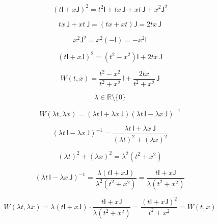 \documentclass[12pt]{article}
\begin{document}
\begin{equation}
(t\mathsf{I}+x\mathsf{J})^2=t^2\mathsf{I}+tx\,\mathsf{J}+xt\,\mathsf{J}+x^2\mathsf{J}^2
\end{equation}

\begin{equation}
tx\,\mathsf{J}+xt\,\mathsf{J}=(tx+xt)\mathsf{J}=2tx\,\mathsf{J}
\end{equation}

\begin{equation}
x^2\mathsf{J}^2=x^2(-\mathsf{I})=-x^2\mathsf{I}
\end{equation}

\begin{equation}
(t\mathsf{I}+x\mathsf{J})^2=(t^2-x^2)\mathsf{I}+2tx\,\mathsf{J}
\end{equation}

\begin{equation}
W(t,x)=\frac{t^2-x^2}{t^2+x^2}\,\mathsf{I}+\frac{2tx}{t^2+x^2}\,\mathsf{J}
\end{equation}

\begin{equation}
\lambda\in\mathbb{R}\setminus\{0\}
\end{equation}

\begin{equation}
W(\lambda t,\lambda x)=(\lambda t\,\mathsf{I}+\lambda x\,\mathsf{J})(\lambda t\,\mathsf{I}-\lambda x\,\mathsf{J})^{-1}
\end{equation}

\begin{equation}
(\lambda t\,\mathsf{I}-\lambda x\,\mathsf{J})^{-1}=\frac{\lambda t\,\mathsf{I}+\lambda x\,\mathsf{J}}{(\lambda t)^2+(\lambda x)^2}
\end{equation}

\begin{equation}
(\lambda t)^2+(\lambda x)^2=\lambda^2(t^2+x^2)
\end{equation}

\begin{equation}
(\lambda t\,\mathsf{I}-\lambda x\,\mathsf{J})^{-1}=\frac{\lambda(t\mathsf{I}+x\mathsf{J})}{\lambda^2(t^2+x^2)}=\frac{t\mathsf{I}+x\mathsf{J}}{\lambda(t^2+x^2)}
\end{equation}

\begin{equation}
W(\lambda t,\lambda x)=\lambda(t\mathsf{I}+x\mathsf{J})\cdot\frac{t\mathsf{I}+x\mathsf{J}}{\lambda(t^2+x^2)}=\frac{(t\mathsf{I}+x\mathsf{J})^2}{t^2+x^2}=W(t,x)
\end{equation}
\end{document}
